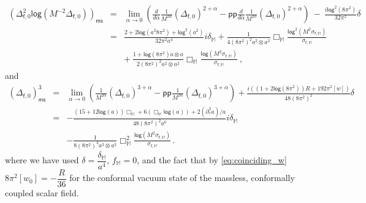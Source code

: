 \documentclass[11pt]{book}
\newcommand{\pp}{\mathsf{pp}}
\newcommand{\ms}{\mathsf{ms}}
\renewcommand{\log}{\mathsf{log}}
\newcommand{\Mbb}{\mathbb{M}}
\newcommand{\fsf}{\mathsf{f}}
\theoremstyle{break}
\begin{document}
%
\begin{eqnarray*}
\left(\Delta^2_{\fsf,0} \log\left(M^{-2} \Delta_{\fsf,0}\right)\right)_\ms
&=& \lim_{\alpha\to 0}\left(\frac{d}{d\alpha}\frac{1}{M^{2\alpha}}(\Delta_{\fsf,0})^{2+\alpha}-\pp\frac{d}{d\alpha}\frac{1}{M^{2\alpha}}(\Delta_{\fsf,0})^{2+\alpha}\right) \ - \ \frac{i\log^2(8\pi^2)}{32\pi^2}\delta \\
%
&=& \frac{2+2\log (a^2 8\pi^2)+\log^2 (a^2)}{32\pi^2 a^4}i\delta_\mathbb{M}+\frac{1}{4(8\pi^2)^2 a^2\otimes a^2}\Box_{\mathbb{M}}\frac{\log^2\left(M^2\sigma_{\fsf,\mathbb{M}}\right)}{\sigma_{\fsf,\mathbb{M}}}\\
%
&& + \ \frac{1+\log(8\pi^2) a\otimes a}{2(8\pi^2)^2 a^2\otimes a^2}\Box_{\mathbb{M}}\frac{\log\left(M^2\sigma_{\fsf,\mathbb{M}}\right)}{\sigma_{\fsf,\mathbb{M}}} \ ,
\end{eqnarray*}
%
and
%
\begin{eqnarray*}
(\Delta_{\fsf,0})^3_\ms 
&=& \lim_{\alpha\to 0}\left(\frac{1}{M^{2\alpha}}(\Delta_{\fsf,0})^{3+\alpha}-\pp\frac{1}{M^{2\alpha}}(\Delta_{\fsf,0})^{3+\alpha}\right)+\frac{i\left((1+2\log(8\pi^2))R+192\pi^2[w]\right)}{48(8\pi^2)^2}\delta\\
%
&=&-\frac{(15+12\log (a))\Box_\mathbb{M}+6(\Box_\mathbb{M} \log (a))+2(\partial^2_\tau a)/a}{48(8\pi^2)^2a^6}i\delta_\mathbb{M} \\ 
&& - \frac{1}{8(8\pi^2)^3 a^3\otimes a^3}\Box^2_{\mathbb{M}}\frac{\log\left(M^2\sigma_{\fsf,\mathbb{M}}\right)}{\sigma_{\fsf,\mathbb{M}}}\,.
\end{eqnarray*}
%
where we have used $\delta = \dfrac{\delta_{\Mbb}}{a^4}$, $f_{\Mbb}=0$, and the fact that by \eqref{eq:coinciding_w} $8\pi^2[w_0]=-\dfrac{R}{36}$ for the conformal vacuum state of the massless, conformally coupled scalar field. 
\end{document}
